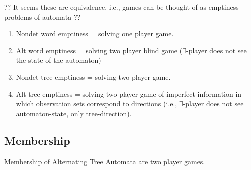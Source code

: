 \documentclass[a4paper,10pt]{article}
\begin{document}
?? It seems these are equivalence. i.e., games can be thought of as emptiness problems of automata ??

\begin{enumerate}
 \item 
Nondet word emptiness = solving one player game.

\item 
Alt word emptiness = solving two player blind game ($\exists$-player does not see the state of the automaton) 

\item 
Nondet tree emptiness = solving two player game.

\item 
Alt tree emptiness = solving two player game of imperfect information in which observation sets correspond to directions (i.e., $\exists$-player does not see automaton-state, only tree-direction).

\end{enumerate}

\subsection{Membership}

Membership of Alternating Tree Automata are two player games.





\end{document}
